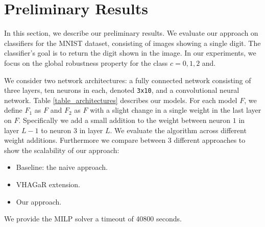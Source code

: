 
\section{Preliminary Results}
In this section, we describe our preliminary results.
We evaluate our approach on classifiers for the MNIST dataset, consisting of images showing a single digit.
The classifier's goal is to return the digit shown in the image. In our experiments, we focus on the global robustness property for the class $c=0,1,2$ and.

We consider two network architectures: 
a fully connected network consisting of three layers, ten neurons in each, denoted \texttt{3x10}, and a convolutional neural network. 
Table \ref{table_architectures} describes our models. For each model $F$, we define $F_1$ as $F$ and $F_2$ as $F$ with a slight change in a single weight in the last layer on $F$. Specifically we add a small addition to the weight between neuron $1$ in layer $L-1$ to neuron $3$ in layer $L$. We evaluate the algorithm across different weight additions. 
Furthermore we compare between 3 different approaches to show the scalability of our approach:
\begin{itemize}
    \item Baseline: the naive approach.
    \item VHAGaR extension.
    \item Our approach.
\end{itemize} 
We provide the MILP solver a timeout of 40800 seconds.

\begin{table}[H]
    \centering
    \caption{The networks used for this experience.
        \label{table_architectures}}
\end{table}

